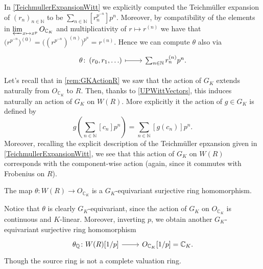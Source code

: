 \begin{rem}[]
	In \cref{TeichmullerExpansionWitt} we explicitly computed the Teichmüller
	expansion of $\left( r_n \right)_{n \in \mathbb{N}}$
	to be $\sum_{n \in \mathbb{N} }^{  } [r_n^{p^{-n}}] p^n$.
	Moreover, by compatibility of the elements in $\varprojlim_{x \mapsto x^p} O_{\mathbb{C}_K}$
	and multiplicativity of $r \mapsto r^{(n)}$
	we have that $\big( r^{p^{-n}} \big)^{(0)} = \big( (r^{p^{-n}})^{(n)} \big)^{p^n} =
	r^{(n)}$.
	Hence we can compute $\theta$ also via
	\begin{equation*}
	\begin{tikzcd}
		\theta\colon 
		\left( r_0, r_1, \ldots \right)
		\arrow[r, "", mapsto] &
		\sum_{n \in \mathbb{N} }^{  } r_n^{(n)} p^n
	.\end{tikzcd}
	\end{equation*}
\end{rem}


\begin{rem}[]\label{GKActionWR}
	Let's recall that in \cref{rem:GKActionR} we saw that
	the action of $G_K$ extends naturally from $O_{\mathbb{C}_K}$ to $R$.
	Then, thanks to \cref{UPWittVectors}, this induces naturally
	an action of $G_K$ on $W(R)$.
	More explicitly it the action of $g \in G_K$ is defined by
	\begin{equation*}
		g \left( \sum_{n \in \mathbb{N} }^{  } [c_n] p^n \right) =
		\sum_{n \in \mathbb{N} }^{  } [g(c_n)] p^n
	.\end{equation*}
	Moreover, recalling the explicit description of the Teichmüller
	epxansion given in \cref{TeichmullerExpansionWitt}, we see that this
	action of $G_K$ on $W(R)$ corresponds with the component-wise action
	(again, since it commutes with Frobenius on $R$).
\end{rem}


\begin{lem}
	The map $\theta\colon W(R) \to O_{\mathbb{C}_K}$ is a $G_K$-equivariant surjective ring homomorphism.
\end{lem} 


\begin{rem}[]
	Notice that $\theta$ is clearly $G_K$-equivariant, since the action of
	$G_K$ on $O_{\mathbb{C}_K}$ is continuous and $K$-linear.
	Moreover, inverting $p$, we obtain another $G_K$-equivariant surjective ring homomorphism
	\begin{equation*}
	\begin{tikzcd}[row sep = 0ex
		,/tikz/column 1/.append style={anchor=base east}
		,/tikz/column 2/.append style={anchor=base west}]
		\theta_{\mathbb{Q}}\colon W(R)[1/p] \arrow[r, "", rightarrow] &
		O_{\mathbb{C}_K}[1/p] = \mathbb{C}_K
	.\end{tikzcd}
	\end{equation*} 
	Though the source ring is not a complete valuation ring.
\end{rem}


